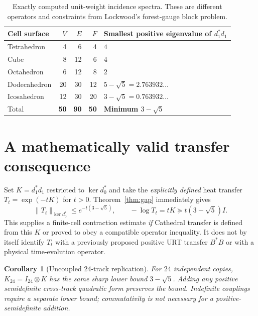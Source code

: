\documentclass[11pt,a4paper]{article}
\newtheorem{corollary}{Corollary}
\begin{document}
\begin{table}[ht]
\centering\small
\begin{tabular}{lrrrl}
\toprule
Cell surface & $V$ & $E$ & $F$ & Smallest positive eigenvalue of $d_1^{\!*}d_1$ \\
\midrule
Tetrahedron &4&6&4& $4$ \\
Cube &8&12&6& $4$ \\
Octahedron &6&12&8& $2$ \\
Dodecahedron &20&30&12& $5-\sqrt5=2.763932\ldots$ \\
Icosahedron &12&30&20& $3-\sqrt5=0.763932\ldots$ \\
\midrule
Total & \textbf{50}&\textbf{90}&\textbf{50}& \textbf{Minimum $3-\sqrt5$} \\
\bottomrule
\end{tabular}
\caption{Exactly computed unit-weight incidence spectra. These are different operators and constraints from Lockwood's forest-gauge block problem.}\label{tab:gaps}
\end{table}

\section{A mathematically valid transfer consequence}
Set $K=d_1^{\!*}d_1$ restricted to $\ker d_0^{\!*}$ and take the \emph{explicitly defined} heat transfer $T_t=\exp(-tK)$ for $t>0$. Theorem~\ref{thm:gap} immediately gives
\begin{equation}\label{eq:semigroup}
 \|T_t\|_{\ker d_0^{\!*}}\le e^{-t(3-\sqrt5)},
 \qquad -\log T_t=tK\succeq t(3-\sqrt5)I.
\end{equation}
This supplies a finite-cell contraction estimate \emph{if} Cathedral transfer is defined from this $K$ or proved to obey a compatible operator inequality. It does not by itself identify $T_t$ with a previously proposed positive URT transfer $B^{\!*}B$ or with a physical time-evolution operator.

\begin{corollary}[Uncoupled 24-track replication]
For $24$ independent copies, $K_{24}=I_{24}\otimes K$ has the same sharp lower bound $3-\sqrt5$. Adding any positive semidefinite cross-track quadratic form preserves the bound. Indefinite couplings require a separate lower bound; commutativity is not necessary for a positive-semidefinite addition.
\end{corollary}
\end{document}
